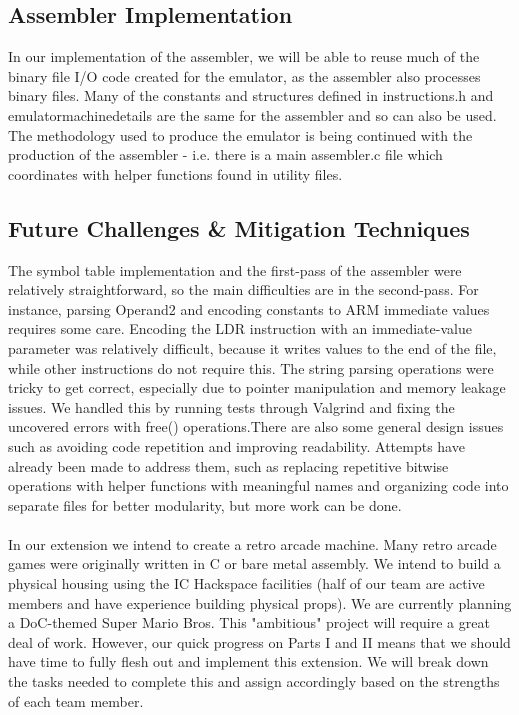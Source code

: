 \documentclass[11pt,twoside]{article}
\begin{document}
\subsection{Assembler Implementation}
In our implementation of the assembler, we will be able to reuse much of the binary file I/O code created for the emulator, as the assembler also processes binary files. Many of the constants and structures defined in instructions.h and emulator\textunderscore machine\textunderscore details are the same for the assembler and so can also be used. The methodology used to produce the emulator is being continued with the production of the assembler - i.e. there is a main assembler.c file which coordinates with helper functions found in utility files.

\subsection{Future Challenges \& Mitigation Techniques}
The symbol table implementation and the first-pass of the assembler were relatively straightforward, so the main difficulties are in the second-pass. For instance, parsing Operand2 and encoding constants to ARM immediate values requires some care. Encoding the LDR instruction with an immediate-value parameter was relatively difficult, because it writes values to the end of the file, while other instructions do not require this. The string parsing operations were tricky to get correct, especially due to pointer manipulation and memory leakage issues. We handled this by running tests through Valgrind and fixing the uncovered errors with free() operations.There are also some general design issues such as avoiding code repetition and improving readability. Attempts have already been made to address them, such as replacing repetitive bitwise operations with helper functions with meaningful names and organizing code into separate files for better modularity, but more work can be done.
\\\\
In our extension we intend to create a retro arcade machine. Many retro arcade games were originally written in C or bare metal assembly. We intend to build a physical housing using the IC Hackspace facilities (half of our team are active members and have experience building physical props). We are currently planning a DoC-themed Super Mario Bros. This "ambitious" project will require a great deal of work. However, our quick progress on Parts I and II means that we should have time to fully flesh out and implement this extension. We will break down the tasks needed to complete this and assign accordingly based on the strengths of each team member.
\end{document}
